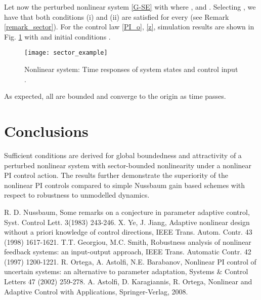 \documentclass[preprint,12pt]{article}
\begin{document}
Let now the perturbed nonlinear system \eqref{G-SE} with  where ,  and . Selecting , we have that both conditions (i) and (ii) are satisfied for every  (see Remark \ref{remark_sector}).  For the  control law \eqref{PI_o}, \eqref{z},  simulation results are shown in Fig. \ref{sector_example} with   and initial conditions .
\begin{figure}[!t]
\centering
\texttt{[image: sector\_example]}
\caption{Nonlinear system: Time responses of system states   and control input .}
\label{sector_example}
\end{figure}
As expected, all  are bounded and converge to the origin as time passes.
 \section{Conclusions}
Sufficient conditions are derived for global boundedness and attractivity of a perturbed nonlinear system with sector-bounded nonlinearity under a nonlinear PI control action.
The results further demonstrate the superiority of the nonlinear PI controls compared to simple Nussbaum gain based schemes with respect to robustness to unmodelled dynamics.







\begin{thebibliography}{00}
R. D. Nussbaum, Some remarks on a conjecture in parameter adaptive
control, Syst. Control Lett. 3(1983) 243-246.
X. Ye, J. Jiang, Adaptive nonlinear design without a priori knowledge
of control directions, IEEE Trans. Autom. Contr. 43 (1998) 1617-1621.
T.T. Georgiou, M.C. Smith, Robustness analysis of nonlinear feedback systems: an input-output approach, IEEE Trans. Automatic Contr. 42 (1997) 1200-1221.
R. Ortega, A. Astolfi, N.E. Barabanov, Nonlinear PI control of uncertain systems: an alternative to
parameter adaptation, Systems \& Control Letters 47 (2002) 259-278.
A. Astolfi, D. Karagiannis, R. Ortega, Nonlinear and Adaptive Control with Applications, Springer-Verlag, 2008.
\end{thebibliography}
\end{document}
